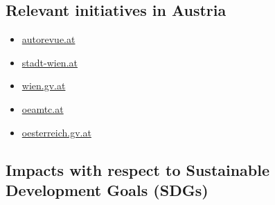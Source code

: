 \documentclass[
]{book}
\providecommand{\tightlist}{%
  \setlength{\itemsep}{0pt}\setlength{\parskip}{0pt}}
\begin{document}
\hypertarget{relevant-initiatives-in-austria-33}{%
\subsection*{Relevant initiatives in Austria}\label{relevant-initiatives-in-austria-33}}

\begin{itemize}
\tightlist
\item
  \href{https://autorevue.at/ratgeber/e-scooter-wien-vergleich}{autorevue.at}
\item
  \href{https://www.stadt-wien.at/wien/news/e-scooter-sharing-system-in-wien.html}{stadt-wien.at}
\item
  \href{https://www.wien.gv.at/verkehr/scooter-roller/index.html}{wien.gv.at}
\item
  \href{https://www.oeamtc.at/thema/fahrrad/e-kleintretroller-e-scooter-in-oesterreich-31721872}{oeamtc.at}
\item
  \href{https://www.oesterreich.gv.at/themen/freizeit_und_strassenverkehr/Elektro-Scooter,-Quads-und-Co/Seite.610110.html}{oesterreich.gv.at}
\end{itemize}

\hypertarget{impacts-with-respect-to-sustainable-development-goals-sdgs-33}{%
\subsection*{Impacts with respect to Sustainable Development Goals (SDGs)}\label{impacts-with-respect-to-sustainable-development-goals-sdgs-33}}
\end{document}
